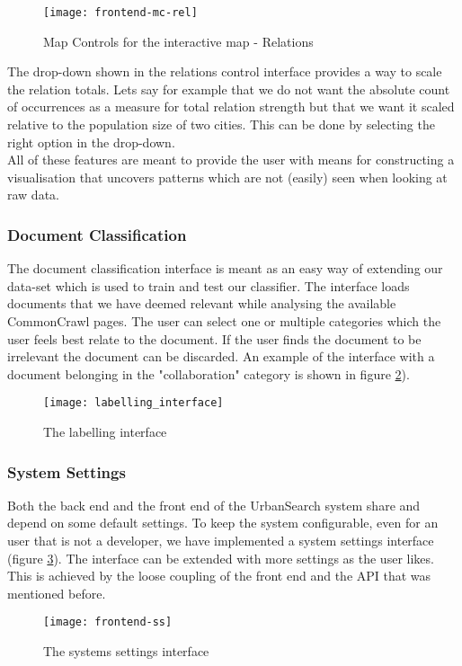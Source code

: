 \begin{figure}[H]
\centering
\texttt{[image: frontend-mc-rel]}
\caption{Map Controls for the interactive map - Relations}
\label{fig:frontend-mc-rel}
\end{figure}

The drop-down shown in the relations control interface provides a way to scale the relation totals. Lets say for example that we do not want the absolute count of occurrences as a measure for total relation strength but that we want it scaled relative to the population size of two cities. This can be done by selecting the right option in the drop-down.\\
All of these features are meant to provide the user with means for constructing a visualisation that uncovers patterns which are not (easily) seen when looking at raw data.
\subsubsection{Document Classification}
The document classification interface is meant as an easy way of extending our data-set which is used to train and test our classifier. The interface loads documents that we have deemed relevant while analysing the available CommonCrawl pages. The user can select one or multiple categories which the user feels best relate to the document. If the user finds the document to be irrelevant the document can be discarded. An example of the interface with a document belonging in the "collaboration" category is shown in figure \ref{fig:frontend-label}).
\begin{figure}[H]
\centering
\texttt{[image: labelling\_interface]}
\caption{The labelling interface}
\label{fig:frontend-label}
\end{figure}

\subsubsection{System Settings}

Both the back end and the front end of the UrbanSearch system share and depend on some default settings. To keep the system configurable, even for an user that is not a developer, we have implemented a system settings interface (figure \ref{fig:frontend-ss}). The interface can be extended with more settings as the user likes. This is achieved by the loose coupling of the front end and the API that was mentioned before.


\begin{figure}[H]
\centering
\texttt{[image: frontend-ss]}
\caption{The systems settings interface}
\label{fig:frontend-ss}
\end{figure}